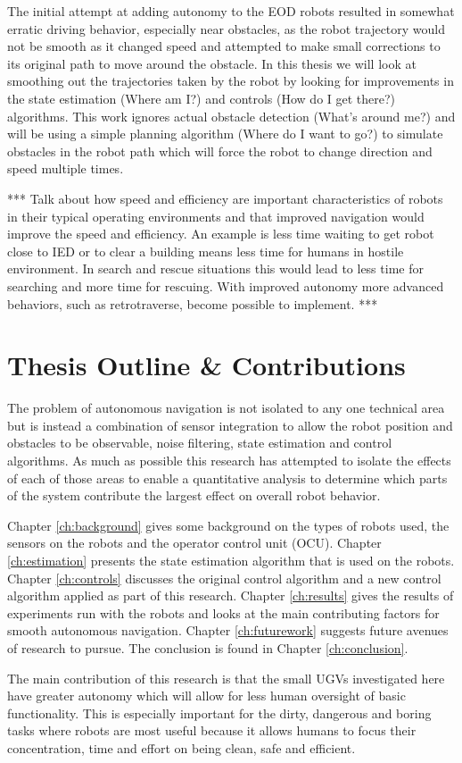 The initial attempt at adding autonomy to the EOD robots resulted in somewhat erratic driving behavior, especially near obstacles, as the robot trajectory would not be smooth as it changed speed and attempted to make small corrections to its original path to move around the obstacle. In this thesis we will look at smoothing out the trajectories taken by the robot by looking for improvements in the state estimation (Where am I?) and controls (How do I get there?) algorithms. This work ignores actual obstacle detection (What's around me?) and will be using a simple planning algorithm (Where do I want to go?) to simulate obstacles in the robot path which will force the robot to change direction and speed multiple times.

*** Talk about how speed and efficiency are important characteristics of robots in their typical operating environments and that improved navigation would improve the speed and efficiency. An example is less time waiting to get robot close to IED or to clear a building means less time for humans in hostile environment. In search and rescue situations this would lead to less time for searching and more time for rescuing. With improved autonomy more advanced behaviors, such as retrotraverse, become possible to implement. ***

\section{Thesis Outline \& Contributions}
\label{sec:outline}
The problem of autonomous navigation is not isolated to any one technical area but is instead a combination of sensor integration to allow the robot position and obstacles to be observable, noise filtering, state estimation and control algorithms. As much as possible this research has attempted to isolate the effects of each of those areas to enable a quantitative analysis to determine which parts of the system contribute the largest effect on overall robot behavior.

Chapter \ref{ch:background} gives some background on the types of robots used, the sensors on the robots and the operator control unit (OCU). Chapter \ref{ch:estimation} presents the state estimation algorithm that is used on the robots. Chapter \ref{ch:controls} discusses the original control algorithm and a new control algorithm applied as part of this research. Chapter \ref{ch:results} gives the results of experiments run with the robots and looks at the main contributing factors for smooth autonomous navigation. Chapter \ref{ch:futurework} suggests future avenues of research to pursue. The conclusion is found in Chapter \ref{ch:conclusion}.

The main contribution of this research is that the small UGVs investigated here have greater autonomy which will allow for less human oversight of basic functionality. This is especially important for the dirty, dangerous and boring tasks where robots are most useful because it allows humans to focus their concentration, time and effort on being clean, safe and efficient.